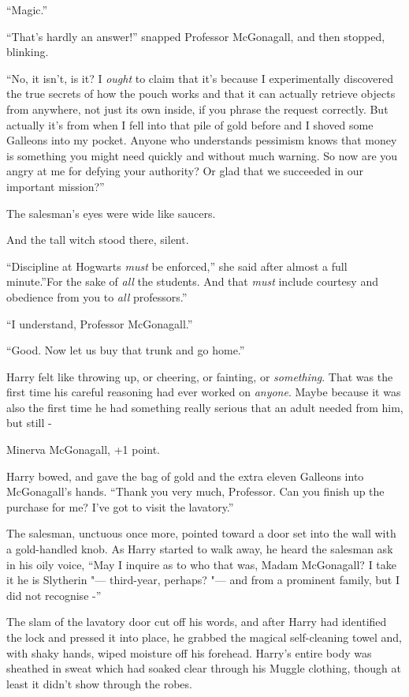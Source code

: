 ``Magic.''

``That's hardly an answer!'' snapped Professor McGonagall, and then
stopped, blinking.

``No, it isn't, is it? I \emph{ought} to claim that it's because I
experimentally discovered the true secrets of how the pouch works and
that it can actually retrieve objects from anywhere, not just its own
inside, if you phrase the request correctly. But actually it's from when
I fell into that pile of gold before and I shoved some Galleons into my
pocket. Anyone who understands pessimism knows that money is something
you might need quickly and without much warning. So now are you angry at
me for defying your authority? Or glad that we succeeded in our
important mission?''

The salesman's eyes were wide like saucers.

And the tall witch stood there, silent.

``Discipline at Hogwarts \emph{must} be enforced,'' she said after almost
a full minute.''For the sake of \emph{all} the students. And that
\emph{must} include courtesy and obedience from you to \emph{all}
professors.''

``I understand, Professor McGonagall.''

``Good. Now let us buy that trunk and go home.''

Harry felt like throwing up, or cheering, or fainting, or
\emph{something}. That was the first time his careful reasoning had ever
worked on \emph{anyone}. Maybe because it was also the first time he had
something really serious that an adult needed from him, but still -

Minerva McGonagall, +1 point.

Harry bowed, and gave the bag of gold and the extra eleven Galleons into
McGonagall's hands. ``Thank you very much, Professor. Can you finish up
the purchase for me? I've got to visit the lavatory.''

The salesman, unctuous once more, pointed toward a door set into the
wall with a gold-handled knob. As Harry started to walk away, he heard
the salesman ask in his oily voice, ``May I inquire as to who that was,
Madam McGonagall? I take it he is Slytherin "--- third-year, perhaps? "--- and
from a prominent family, but I did not recognise -''

The slam of the lavatory door cut off his words, and after Harry had
identified the lock and pressed it into place, he grabbed the magical
self-cleaning towel and, with shaky hands, wiped moisture off his
forehead. Harry's entire body was sheathed in sweat which had soaked
clear through his Muggle clothing, though at least it didn't show
through the robes.

